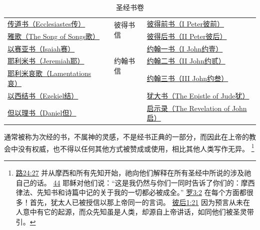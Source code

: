 \documentclass[12pt, a4paper, oneside]{ctexart}
\newcounter{parnum}[section]
\newcommand{\N}{%
   \noindent\refstepcounter{parnum}%
    \makebox[\parindent][l]{\textbf{\arabic{parnum}.}}}
\begin{document}
\begin{table}[ht]
\begin{tabular}{|l l  | l |l | }
			\cline{3-4}
			\href{https://biblehub.com/bibles/ecclesiastes}{传道书（Ecclesiastes传）}      &                &\multirow{2}{*}{彼得书信} & \href{https://biblehub.com/bibles/1_peter}{彼得前书（I Peter彼前）} \\
			\href{https://biblehub.com/bibles/songs}{雅歌（The Song of Songs歌）}   &                &        & \href{https://biblehub.com/bibles/2_peter}{彼得后书（II Peter彼后）} \\
			\cline{3-4}
			\href{https://biblehub.com/bibles/isaiah}{以赛亚书（Isaiah赛）}          &                &\multirow{3}{*}{约翰书信}& \href{https://biblehub.com/bibles/1_john}{约翰一书（I John约壹）} \\
			\href{https://biblehub.com/bibles/jeremiah}{耶利米书（Jeremiah耶）}        &                &        & \href{https://biblehub.com/bibles/2_john}{约翰二书（II John约贰）} \\
			\href{https://biblehub.com/bibles/lamentations}{耶利米哀歌（Lamentations哀）}  &                &        & \href{https://biblehub.com/bibles/3_john}{约翰三书（III John约叁）} \\
			\cline{3-4}
			\href{https://biblehub.com/bibles/ezekiel}{以西结书（Ezekiel结）}         &                &        & \href{https://biblehub.com/bibles/jude}{犹大书（The Epistle of Jude犹）} \\
			\href{https://biblehub.com/bibles/daniel}{但以理书（Daniel但）}          &                &        & \href{https://biblehub.com/bibles/revelation}{启示录（The Revelation of John启）} \\ 
			\hline
		\end{tabular}
		\caption{圣经书卷}
		\label{bible}
	\end{table}

\N 通常被称为次经的书，不属神的灵感，不是经书正典的一部分，而因此在上帝的教会中没有权威，也不得以任何其他方式被赞成或使用，相比其他人类写作无异。
	\footnote {
		\href{https://biblehub.com/luke/24-27.htm}{路24:27} 并从摩西和所有先知开始，祂向他们解释在所有圣经中所说的涉及祂自己的话。
		\href{https://biblehub.com/luke/24-44.htm}{44} 耶稣对他们说：“这是我仍然与你们一同时告诉了你们的：摩西律法、先知书和诗篇中记的关于我的一切都必被成全。” 
		\href{https://biblehub.com/romans/3-2.htm}{罗3:2} 在每个方面都很多！首先，犹太人已被授信以那上帝同一的言词。
		\href{https://biblehub.com/2_peter/1-21.htm}{彼后1:21} 因为预言从未在人意中有它的起源，而众先知虽是人类，却源自上帝讲话，如同他们被圣灵带引。
	}
\end{document}
